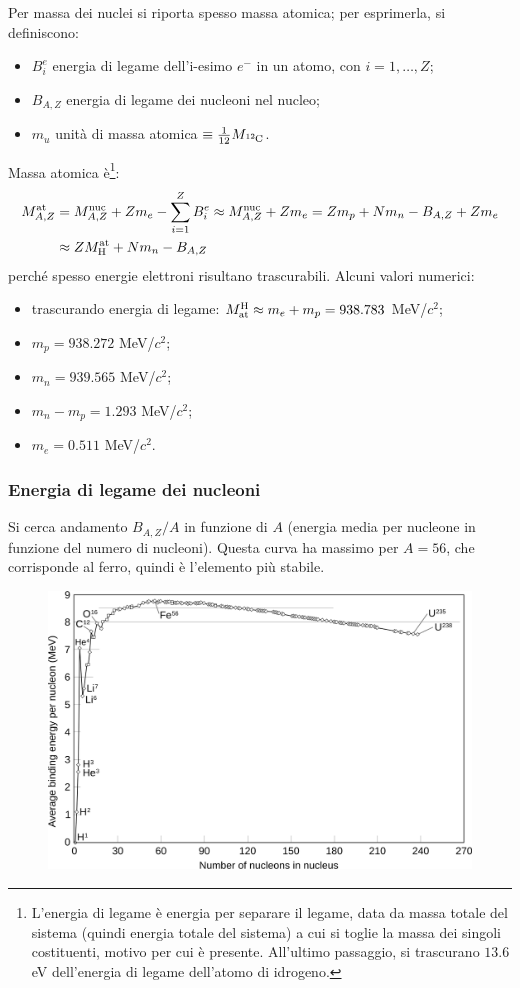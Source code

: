 \documentclass[10pt, a4paper]{scrartcl}
\numberwithin{equation}{subsection}
\theoremstyle{style1}
\begin{document}
Per massa dei nuclei si riporta spesso massa atomica; per esprimerla, si definiscono:
\begin{itemize}
	\item $B_i^e$ energia di legame dell'i-esimo $e^-$ in un atomo, con $i = 1,\ldots,Z$;
	\item $B_{A,Z} $ energia di legame dei nucleoni nel nucleo;
	\item $m_u$ unit\`a di massa atomica $\equiv \frac{1}{12} M_{\ce{^12C}}  $.
\end{itemize}
Massa atomica \`e\footnote{L'energia di legame \`e energia per separare il legame, data da massa totale del sistema (quindi energia totale del sistema) a cui si toglie la massa dei singoli costituenti, motivo per cui \`e presente. All'ultimo passaggio, si trascurano $13.6$ eV dell'energia di legame dell'atomo di idrogeno.}:
\begin{equation}
	\begin{split}
		M_{A,Z} ^{\text{at}} &= M_{A,Z} ^\text{nuc} + Z m_e - \sum_{i=1}^{Z}  B_i^e \approx M_{A,Z} ^\text{nuc} + Z m_e = Zm_p + Nm_n - B_{A,Z} + Zm_e\\
				     &\approx Z M_{\ce{H}}^{\text{at}} + Nm_n - B_{A,Z} 
	\end{split}
\end{equation}
perch\'e spesso energie elettroni risultano trascurabili. Alcuni valori numerici:
\begin{itemize}
	\item trascurando energia di legame: $M^{\ce{H}}_\text{at} \approx m_e + m_p = 938.783$ MeV/$c^2$;
	\item $m_p = 938.272$ MeV/$c^2$;
	\item $m_n = 939.565$ MeV/$c^2$;
	\item $m_n -m_p = 1.293$ MeV/$c^2$;
	\item $m_e =0.511$ MeV/$c^2$.
\end{itemize}
\subsubsection{Energia di legame dei nucleoni}
Si cerca andamento $B_{A,Z}/A$ in funzione di $A$ (energia media per nucleone in funzione del numero di nucleoni). Questa curva ha massimo per $A = 56$, che corrisponde al ferro, quindi \`e l'elemento pi\`u stabile.  
\begin{figure}[h!]
	\centering
	\includegraphics[width=.5\columnwidth]{be.png}
\end{figure}
\end{document}
